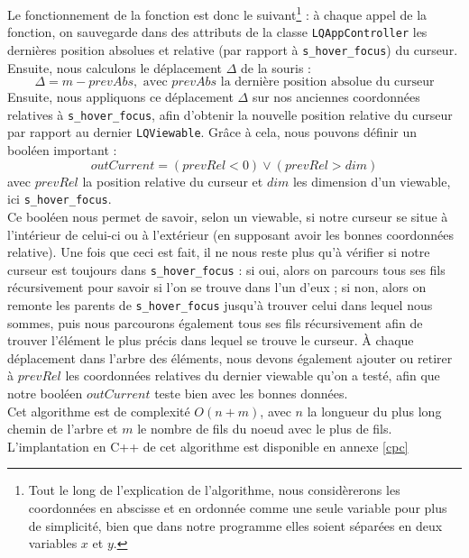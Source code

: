 \documentclass{report}
\begin{document}
Le fonctionnement de la fonction est donc le suivant\footnote{Tout le long de l'explication de l'algorithme, nous considèrerons les coordonnées en abscisse et en ordonnée comme une seule variable pour plus de simplicité, bien que dans notre programme elles soient séparées en deux variables $x$ et $y$.} : à chaque appel de la fonction, on sauvegarde dans des attributs de la classe \verb!LQAppController! les dernières position absolues et relative (par rapport à \verb!s_hover_focus!) du curseur. Ensuite, nous calculons le déplacement $\Delta$ de la souris :
\[\Delta = m - prevAbs, \text{ avec $prevAbs$ la dernière position absolue du curseur}\]
Ensuite, nous appliquons ce déplacement $\Delta$ sur nos anciennes coordonnées relatives à \verb!s_hover_focus!, afin d'obtenir la nouvelle position relative du curseur par rapport au dernier \verb!LQViewable!. Grâce à cela, nous pouvons définir un booléen important :
\[outCurrent = (prevRel < 0) \vee (prevRel > dim)\]
avec $prevRel$ la position relative du curseur et $dim$ les dimension d'un viewable, ici \verb!s_hover_focus!. \\
Ce booléen nous permet de savoir, selon un viewable, si notre curseur se situe à l'intérieur de celui-ci ou à l'extérieur (en supposant avoir les bonnes coordonnées relative).
Une fois que ceci est fait, il ne nous reste plus qu'à vérifier si notre curseur est toujours dans \verb!s_hover_focus! : si oui, alors on parcours tous ses fils récursivement pour savoir si l'on se trouve dans l'un d'eux ; si non, alors on remonte les parents de \verb!s_hover_focus! jusqu'à trouver celui dans lequel nous sommes, puis nous parcourons également tous ses fils récursivement afin de trouver l'élément le plus précis dans lequel se trouve le curseur. À chaque déplacement dans l'arbre des éléments, nous devons également ajouter ou retirer à $prevRel$ les coordonnées relatives du dernier viewable qu'on a testé, afin que notre booléen $outCurrent$ teste bien avec les bonnes données. \\
Cet algorithme est de complexité $O(n+m)$, avec $n$ la longueur du plus long chemin de l'arbre et $m$ le nombre de fils du noeud avec le plus de fils. L'implantation en C++ de cet algorithme est disponible en annexe \ref{cpc}
\end{document}
